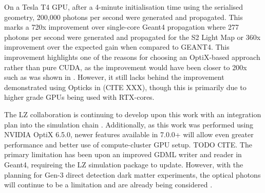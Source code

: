 \par
On a Tesla T4 GPU, after a 4-minute initialisation time using the serialised geometry, 200,000 photons per second were generated and propagated.
This marks a 720x improvement over single-core Geant4 propagation where 277 photons per second were generated and propagated for the S2 Light Map or 360x improvement over the expected gain when compared to GEANT4.
This improvement highlights one of the reasons for choosing an OptiX-based approach rather than pure CUDA, as the improvement would have been closer to 200x such as was shown in \cite{chroma_presentation_ref}.
However, it still lacks behind the improvement demonstrated using Opticks in (CITE XXX), though this is primarily due to higher grade GPUs being used with RTX-cores.

\par
The LZ collaboration is continuing to develop upon this work with an integration plan into the simulation chain \cite{SEriksen_Opticks_CHEP_2021_ref, SEriksen_IoP_2021_talk_ref, lz_status_with_opticks_ref}.
Additionally, as this work was performed using NVIDIA OptiX 6.5.0, newer features available in 7.0.0+ will allow even greater performance and better use of compute-cluster GPU setup.
TODO CITE.
The primary limitation has been upon an improved GDML writer and reader in Geant4, requireing the LZ simulation package to update. 
However, with the planning for Gen-3 direct detection dark matter experiments, the optical photons will continue to be a limitation and are already being considered \cite{DARWIN_GPU_simulations_2022_ref,  accelerated_bvh_ref}.